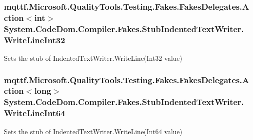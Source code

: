 \hypertarget{class_system_1_1_code_dom_1_1_compiler_1_1_fakes_1_1_stub_indented_text_writer_a28e9da92eeacacadeab2956897a8fe25}{
\subsubsection[{Write\-Line\-Int32}]{\setlength{\rightskip}{0pt plus 5cm}mqttf.\-Microsoft.\-Quality\-Tools.\-Testing.\-Fakes.\-Fakes\-Delegates.\-Action$<$int$>$ System.\-Code\-Dom.\-Compiler.\-Fakes.\-Stub\-Indented\-Text\-Writer.\-Write\-Line\-Int32}}\label{class_system_1_1_code_dom_1_1_compiler_1_1_fakes_1_1_stub_indented_text_writer_a28e9da92eeacacadeab2956897a8fe25}


Sets the stub of Indented\-Text\-Writer.\-Write\-Line(\-Int32 value)

\hypertarget{class_system_1_1_code_dom_1_1_compiler_1_1_fakes_1_1_stub_indented_text_writer_a657b45c192824363dae987dbcbf330af}{
\subsubsection[{Write\-Line\-Int64}]{\setlength{\rightskip}{0pt plus 5cm}mqttf.\-Microsoft.\-Quality\-Tools.\-Testing.\-Fakes.\-Fakes\-Delegates.\-Action$<$long$>$ System.\-Code\-Dom.\-Compiler.\-Fakes.\-Stub\-Indented\-Text\-Writer.\-Write\-Line\-Int64}}\label{class_system_1_1_code_dom_1_1_compiler_1_1_fakes_1_1_stub_indented_text_writer_a657b45c192824363dae987dbcbf330af}


Sets the stub of Indented\-Text\-Writer.\-Write\-Line(\-Int64 value)

